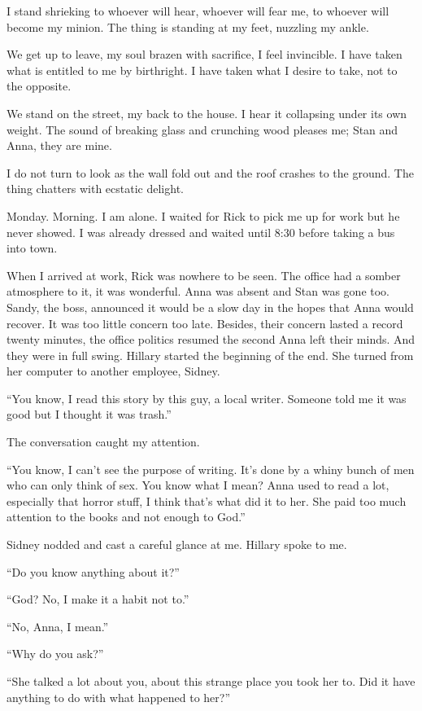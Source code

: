 \documentclass[
]{article}
\begin{document}
I stand shrieking to whoever will hear, whoever will fear me, to whoever
will become my minion. The thing is standing at my feet, nuzzling my
ankle.

We get up to leave, my soul brazen with sacrifice, I feel invincible. I
have taken what is entitled to me by birthright. I have taken what I
desire to take, not to the opposite.

We stand on the street, my back to the house. I hear it collapsing under
its own weight. The sound of breaking glass and crunching wood pleases
me; Stan and Anna, they are mine.

I do not turn to look as the wall fold out and the roof crashes to the
ground. The thing chatters with ecstatic delight.

Monday. Morning. I am alone. I waited for Rick to pick me up for work
but he never showed. I was already dressed and waited until 8:30 before
taking a bus into town.

When I arrived at work, Rick was nowhere to be seen. The office had a
somber atmosphere to it, it was wonderful. Anna was absent and Stan was
gone too. Sandy, the boss, announced it would be a slow day in the hopes
that Anna would recover. It was too little concern too late. Besides,
their concern lasted a record twenty minutes, the office politics
resumed the second Anna left their minds. And they were in full swing.
Hillary started the beginning of the end. She turned from her computer
to another employee, Sidney.

``You know, I read this story by this guy, a local writer. Someone told
me it was good but I thought it was trash.''

The conversation caught my attention.

``You know, I can't see the purpose of writing. It's done by a whiny
bunch of men who can only think of sex. You know what I mean? Anna used
to read a lot, especially that horror stuff, I think that's what did it
to her. She paid too much attention to the books and not enough to
God.''

Sidney nodded and cast a careful glance at me. Hillary spoke to me.

``Do you know anything about it?''

``God? No, I make it a habit not to.''

``No, Anna, I mean.''

``Why do you ask?''

``She talked a lot about you, about this strange place you took her to.
Did it have anything to do with what happened to her?''
\end{document}
